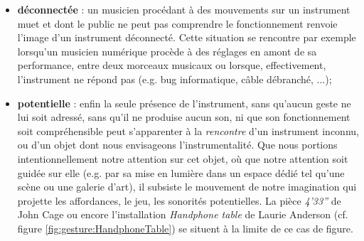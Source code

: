 \begin{itemize}[noitemsep]
	\item \textbf{déconnectée} : un musicien procédant à des mouvements sur un instrument muet et dont le public ne peut pas comprendre le fonctionnement renvoie l'image d'un instrument déconnecté. Cette situation se rencontre par exemple lorsqu'un musicien numérique procède à des réglages en amont de sa performance, entre deux morceaux musicaux ou lorsque, effectivement, l'instrument ne répond pas (e.g. bug informatique, câble débranché, ...);
	\item \textbf{potentielle} : enfin la seule présence de l'instrument, sans qu'aucun geste ne lui soit adressé, sans qu'il ne produise aucun son, ni que son fonctionnement soit compréhensible peut s'apparenter à la \textit{rencontre} d'un instrument inconnu, ou d'un objet dont nous envisageons l'instrumentalité. Que nous portions intentionnellement notre attention sur cet objet, où que notre attention soit guidée sur elle (e.g. par sa mise en lumière dans un espace dédié tel qu'une scène ou une galerie d'art), il subsiste le mouvement de notre imagination qui projette les affordances, le jeu, les sonorités potentielles. La pièce \textit{4'33''} de John Cage ou encore l'installation \textit{Handphone table} de Laurie Anderson (cf. figure \ref{fig:gesture:HandphoneTable}) se situent à la limite de ce cas de figure.
\end{itemize}
